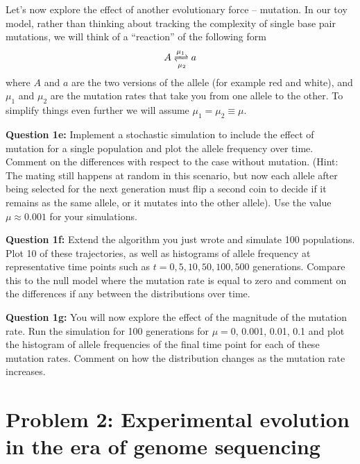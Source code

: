 \documentclass[12pt]{article}    %
\begin{document}
Let's now explore the effect of another evolutionary force -- mutation. In
our toy model, rather than thinking about tracking the complexity of single base
pair mutations, we will think of a ``reaction'' of the following form
\begin{equation}
A \xrightleftharpoons[\mu_2]{\mu_1} a
\end{equation}
where $A$ and $a$ are the two versions of the allele (for example red and
white), and $\mu_1$ and $\mu_2$ are the mutation rates that take you from one
allele to the other. To simplify things even further we will assume $\mu_1 =
\mu_2 \equiv \mu$.

\vspace{5mm}
\textbf{Question 1e:} Implement a stochastic simulation to include the effect of
mutation for a single population and plot the allele frequency over time.
Comment on the differences with respect to the case without mutation. (Hint: The
mating still happens at random in this scenario, but now each allele after being
selected for the next generation must flip a second coin to decide if it
remains as the same allele, or it mutates into the other allele). Use the value
$\mu \approx 0.001$ for your simulations.
\vspace{5mm}

\vspace{5mm}
\textbf{Question 1f:} Extend the algorithm you just wrote and simulate 100
populations. Plot 10 of these trajectories, as well as histograms of allele
frequency at representative time points such as $t = 0, 5, 10, 50, 100, 500$
generations. Compare this to the null model where the mutation rate is equal
to zero and comment on the differences if any between the distributions over
time.
\vspace{5mm}

\vspace{5mm}
\textbf{Question 1g:} You will now explore the effect of the magnitude of the
mutation rate. Run the simulation for 100 generations for $\mu =$0,  0.001,
0.01, 0.1 and plot the histogram of allele frequencies of the final time point
for each of these mutation rates. Comment on how the distribution changes as the
mutation rate increases.
\vspace{5mm}


\clearpage

\section{Problem 2: Experimental evolution in the era of genome sequencing}
\end{document}
